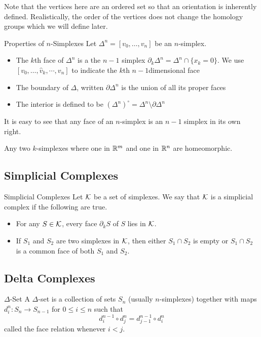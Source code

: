 \documentclass[a4paper]{article}
\begin{document}
Note that the vertices here are an ordered set so that an orientation is inherently defined. Realistically, the order of the vertices does not change the homology groups which we will define later. 

\begin{defn}{Properties of $n$-Simplexes}{} Let $\Delta^n=[v_0,\dots,v_n]$ be an $n$-simplex. 
\begin{itemize}
\item The $k$th face of $\Delta^n$ is a the $n-1$ simplex $\partial_k\Delta^n=\Delta^n\cap\{x_k=0\}$. We use $[v_0,\dots,\hat{v}_k,\cdots,v_n]$ to indicate the $k$th $n-1$dimensional face
\item The boundary of $\Delta$, written $\partial\Delta^n$ is the union of all its proper faces
\item The interior is defined to be $(\Delta^n)^\circ=\Delta^n\setminus\partial\Delta^n$
\end{itemize}
\end{defn}

It is easy to see that any face of an $n$-simplex is an $n-1$ simplex in its own right. 

\begin{lmm}{}{} Any two $k$-simplexes where one in $\mathbb{R}^m$ and one in $\mathbb{R}^n$ are homeomorphic. 
\end{lmm}

\subsection{Simplicial Complexes}
\begin{defn}{Simplicial Complexes}{} Let $\mathcal{K}$ be a set of simplexes. We say that $\mathcal{K}$ is a simplicial complex if the following are true. 
\begin{itemize}
\item For any $S\in\mathcal{K}$, every face $\partial_k S$ of $S$ lies in $\mathcal{K}$. 
\item If $S_1$ and $S_2$ are two simplexes in $\mathcal{K}$, then either $S_1\cap S_2$ is empty or $S_1\cap S_2$ is a common face of both $S_1$ and $S_2$. 
\end{itemize}
\end{defn}

\subsection{Delta Complexes}
\begin{defn}{$\Delta$-Set}{} A $\Delta$-set is a collection of sets $S_n$ (usually $n$-simplexes) together with maps $d_i^n:S_n\to S_{n-1}$ for $0\leq i\leq n$ such that $$d_i^{n-1}\circ d_j^n=d_{j-1}^{n-1}\circ d_i^n$$ called the face relation whenever $i<j$. 
\end{defn}
\end{document}
